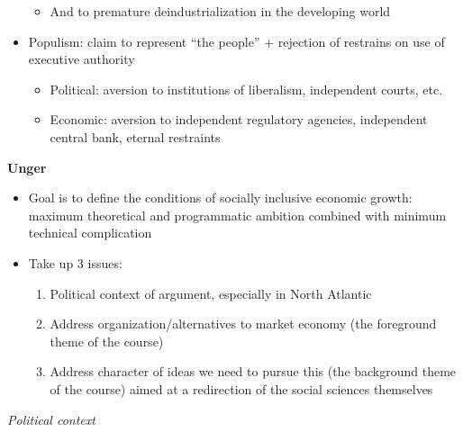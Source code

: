 \begin{itemize}
  \begin{itemize}
  \tightlist
  \item
    And to premature deindustrialization in the developing world
  \end{itemize}
\item
  Populism: claim to represent ``the people'' + rejection of restrains
  on use of executive authority

  \begin{itemize}
  \tightlist
  \item
    Political: aversion to institutions of liberalism, independent
    courts, etc.
  \item
    Economic: aversion to independent regulatory agencies, independent
    central bank, eternal restraints
  \end{itemize}
\end{itemize}

\textbf{Unger}

\begin{itemize}
\tightlist
\item
  Goal is to define the conditions of socially inclusive economic
  growth: maximum theoretical and programmatic ambition combined with
  minimum technical complication
\item
  Take up 3 issues:

  \begin{enumerate}
  \def\labelenumi{\arabic{enumi}.}
  \tightlist
  \item
    Political context of argument, especially in North Atlantic
  \item
    Address organization/alternatives to market economy (the foreground
    theme of the course)
  \item
    Address character of ideas we need to pursue this (the background
    theme of the course) aimed at a redirection of the social sciences
    themselves
  \end{enumerate}
\end{itemize}

\emph{Political context}


